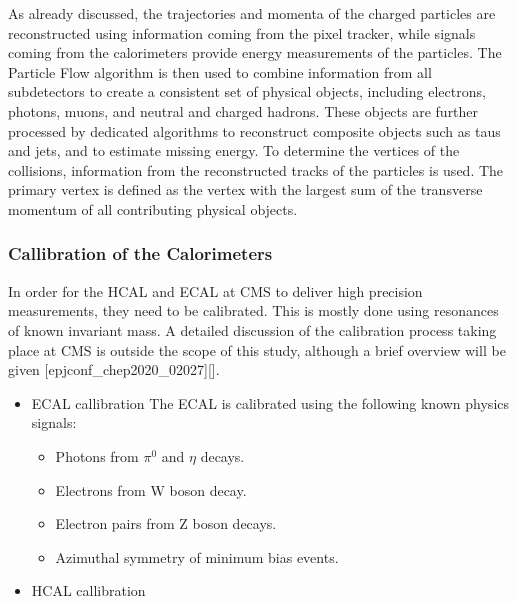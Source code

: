 As already discussed, the trajectories and momenta of the charged particles are reconstructed using information coming from the pixel tracker, while signals coming from the calorimeters provide energy measurements of the particles. The Particle Flow algorithm is then used to combine information from all subdetectors to create a consistent set of physical objects, including electrons, photons, muons, and neutral and charged hadrons. These objects are further processed by dedicated algorithms to reconstruct composite objects such as taus and jets, and to estimate missing energy. To determine the vertices of the collisions, information from the reconstructed tracks of the particles is used. The primary vertex is defined as the vertex with the largest sum of the transverse momentum of all contributing physical objects.
\subsubsection{Callibration of the Calorimeters}
\label{sec:org47fa4e3}
In order for the HCAL and ECAL at CMS to deliver high precision measurements, they need to be calibrated. This is mostly done using resonances of known invariant mass. A detailed discussion of the calibration process taking place at CMS is outside the scope of this study, although a brief overview will be given [epjconf\_chep2020\_02027][].
\begin{itemize}
\item ECAL callibration
\label{sec:org8cf870c}
The ECAL is calibrated using the following known physics signals:
\begin{itemize}
\item Photons from \(\pi^{0}\) and \(\eta\) decays.
\item Electrons from W boson decay.
\item Electron pairs from Z boson decays.
\item Azimuthal symmetry of minimum bias events.
\end{itemize}
\item HCAL callibration
\label{sec:orgda001d7}
\end{itemize}

